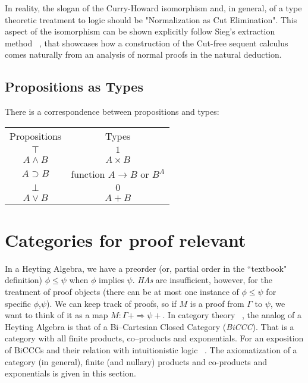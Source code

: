 In reality, the slogan of the Curry-Howard isomorphism and, in general, of a type theoretic treatment to logic should be "Normalization as Cut Elimination". This aspect of the isomorphism can be shown explicitly follow Sieg's extraction method ~\cite{Sieg1998}, that  showcases how a construction of the Cut-free sequent calculus comes naturally from an analysis of normal proofs in the natural deduction. 

 
\subsection{Propositions as Types}



There is a correspondence between propositions and types:
\begin{center}
  \begin{tabular}{@{} cc @{}}

    Propositions & Types \\

    $\top$ & $1$ \\
    $A\wedge B$ & $A\times B$ \\
    $A\supset B$ & function $A\rightarrow B$ or $B^A$ \\
    $\bot$ & $0$ \\
    $A\vee B$ & $A+B$\\

  \end{tabular}
\end{center}



\section{Categories for proof relevant }

In a Heyting Algebra, we have a preorder (or, partial order in the 
``textbook" definition) $\phi\leq \psi$ when $\phi$ implies $\psi$. \emph{HAs} are insufficient, however, for the treatment of proof objects (there can be at most one instance of $\phi\leq\psi$ for specific $\phi$,$\psi$). We can  keep track of proofs, so if $M$ is a proof from  $\Gamma$ to $\psi$, we want to think of it as a map $M:\Gamma+\Longrightarrow \psi+$. In category theory ~\cite{awodey2010category}, the analog of a Heyting Algebra is that of a Bi--Cartesian Closed Category (\emph{BiCCC}). That is a category with all finite products, co--products and exponentials. For an exposition of BiCCCs and their relation with intuitionistic logic ~\cite{Lambek1985}. The axiomatization of a category (in general), finite (and nullary) products and co-products and exponentials is given in this section. 

